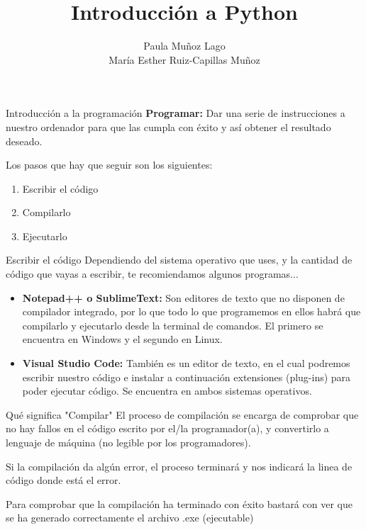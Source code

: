 \documentclass{beamer}
\title{Introducción a Python}
\author{Paula Muñoz Lago \\ María Esther Ruiz-Capillas Muñoz}
\institute{Facultad de Informática, UCM}
\begin{document}
    \begin{frame}
        \maketitle
    \end{frame}

    \begin{frame} {Introducción a la programación}
	    \textbf{Programar:} Dar una serie de instrucciones a nuestro ordenador para que las cumpla con éxito y así obtener el resultado deseado.
	    
	    Los pasos que hay que seguir son los siguientes: 
	    \begin{enumerate}
	    	\item Escribir el código
	    	\item Compilarlo
	    	\item Ejecutarlo
	    \end{enumerate}
	\end{frame}

	\begin{frame} {Escribir el código}
		Dependiendo del sistema operativo que uses, y la cantidad de código que vayas a escribir, te recomiendamos algunos programas...
		
		\begin{itemize}
			\item \textbf{Notepad++ o SublimeText:} Son editores de texto que no disponen de compilador integrado, por lo que todo lo que programemos en ellos habrá que compilarlo y ejecutarlo desde la terminal de comandos. El primero se encuentra en Windows y el segundo en Linux.
			\item \textbf{Visual Studio Code:} También es un editor de texto, en el cual podremos escribir nuestro código e instalar a continuación extensiones (plug-ins) para poder ejecutar código. Se encuentra en ambos sistemas operativos.
		\end{itemize}
	\end{frame}

	\begin{frame}{Qué significa "Compilar"}
    	\setlength{\parskip}{8mm}
    	El proceso de compilación se encarga de comprobar que no hay fallos en el código escrito por el/la programador(a), y convertirlo a lenguaje de máquina (no legible por los programadores).
    	
    	Si la compilación da algún error, el proceso terminará y nos indicará la linea de código donde está el error.
    	
    	Para comprobar que la compilación ha terminado con éxito bastará con ver que se ha generado correctamente el archivo .exe (ejecutable)
	\end{frame}
\end{document}
